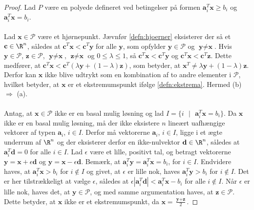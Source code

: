 %
\begin{proof}
Lad $P$ være en polyede defineret ved betingelser på formen $\textbf{a}_i^T\textbf{x} \geq b_i$ og $\textbf{a}_i^T\textbf{x} = b_i$.\\\\
%
Lad $\textbf{x} \in \mathcal{P}$ være et hjørnepunkt. Jævnfør \ref{defn:hjoerner} eksisterer der så et $\textbf{c} \in \R^n$, således at $\textbf{c}^T\textbf{x} < \textbf{c}^T\textbf{y}$ for alle $\textbf{y}$, som opfylder $\textbf{y} \in \mathcal{P}$ og $\textbf{y} \neq \textbf{x}$.
Hvis $\textbf{y} \in \mathcal{P}$, $\textbf{z} \in \mathcal{P}$, $\textbf{y} \neq \textbf{x}$, $\textbf{z} \neq \textbf{x}$ og $0 \leq \lambda \leq 1$, så $\textbf{c}^T\textbf{x} < \textbf{c}^T\textbf{y}$ og $\textbf{c}^T\textbf{x} < \textbf{c}^T\textbf{z}$.
Dette medfører, at $\textbf{c}^T\textbf{x} < \textbf{c}^T(\lambda \textbf{y} + (1-\lambda)\textbf{z})$, som betyder, at $\textbf{x}^T \neq \lambda \textbf{y} + (1 - \lambda)\textbf{z}$.
Derfor kan $\textbf{x}$ ikke blive udtrykt som en kombination af to andre elementer i $\mathcal{P}$, hvilket betyder, at $\textbf{x}$ er et ekstremumspunkt ifølge \ref{defn:ekstrema}.
Hermed (b) $\Rightarrow$ (a).
\\\\
%
Antag, at $\textbf{x} \in \mathcal{P}$ ikke er en basal mulig løsning og lad $I = \{ i \text{ } | \text{ }  \textbf{a}_i^T \textbf{x} = b_i\}$.
Da $\textbf{x}$ ikke er en basal mulig løsning, må der ikke eksistere $n$ lineært uafhængige vektorer af typen $\textbf{a}_i$, $i \in I$.
Derfor må vektorerne $\textbf{a}_i$, $i \in I$, ligge i et ægte underrum af $\R^n$ og der eksisterer derfor en ikke-nulvektor $\textbf{d} \in \R^n$, således at $\textbf{a}_i^T\textbf{d} = 0$ for alle $i \in I$.
Lad $\epsilon$ være et lille, positivt tal, og betragt vektorerne $\textbf{y} = \textbf{x} + \epsilon\textbf{d}$ og $\textbf{y} = \textbf{x} - \epsilon\textbf{d}$.
Bemærk, at $\textbf{a}_i^T \textbf{y} = \textbf{a}_i^T \textbf{x} = b_i$, for $i \in I$.
Endvidere haves, at $\textbf{a}_i^T \textbf{x} > b_i$ for $i \notin I$ og givet, at $\epsilon$ er lille nok, haves $\textbf{a}_i^T \textbf{y} > b_i$ for $i \notin I$.
Det er her tilstrækkeligt at vælge $\epsilon$, således at $\epsilon |\textbf{a}_i^T\textbf{d}| < \textbf{a}_i^T\textbf{x} - b_i$ for alle $i \notin I$.
Når $\epsilon$ er lille nok, haves det, at $\textbf{y} \in \mathcal{P}$, og med samme argumentation haves, at $\textbf{z} \in \mathcal{P}$.
Dette betyder, at $\textbf{x}$ ikke er et ekstremumspunkt, da $\textbf{x} = \frac{\textbf{y} + \textbf{z}}{2}$.

\end{proof}
